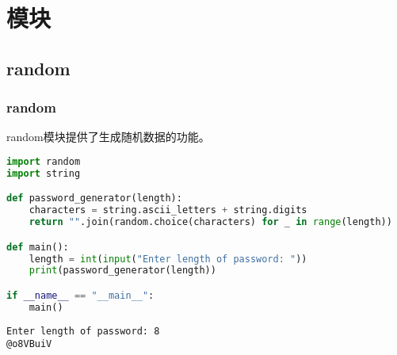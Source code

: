 \chapter{模块}

\section{random}

\subsection{random}

random模块提供了生成随机数据的功能。

\begin{table}[H]
    \centering
    \caption{random模块}
\end{table}


\begin{lstlisting}[language=Python]
import random
import string

def password_generator(length):
    characters = string.ascii_letters + string.digits
    return "".join(random.choice(characters) for _ in range(length))

def main():
    length = int(input("Enter length of password: "))
    print(password_generator(length))

if __name__ == "__main__":
    main()
\end{lstlisting}

\begin{tcolorbox}
    \begin{verbatim}
Enter length of password: 8
@o8VBuiV
\end{verbatim}
\end{tcolorbox}


